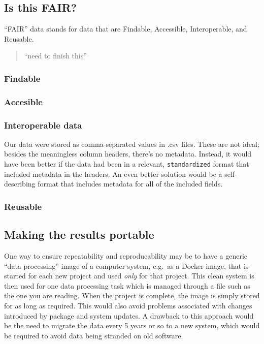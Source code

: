 \documentclass[11pt,]{article}
\begin{document}
\hypertarget{is-this-fair}{%
\subsection{Is this FAIR?}\label{is-this-fair}}

``FAIR'' data stands for data that are Findable, Accessible, Interoperable, and Reusable.

\begin{quote}
``need to finish this''
\end{quote}

\hypertarget{findable}{%
\subsubsection{Findable}\label{findable}}

\hypertarget{accesible}{%
\subsubsection{Accesible}\label{accesible}}

\hypertarget{interoperable-data}{%
\subsubsection{Interoperable data}\label{interoperable-data}}

Our data were stored as comma-separated values in .csv files. These are not ideal; besides the meaningless column headers, there's no metadata. Instead, it would have been better if the data had been in a relevant, \texttt{standardized} format that included metadata in the headers. An even better solution would be a self-describing format that includes metadata for all of the included fields.

\hypertarget{reusable}{%
\subsubsection{Reusable}\label{reusable}}

\hypertarget{making-the-results-portable}{%
\subsection{Making the results portable}\label{making-the-results-portable}}

One way to ensure repeatability and reproducability may be to have a generic ``data processing'' image of a computer system, e.g.~as a Docker image, that is started for each new project and used \emph{only} for that project. This clean system is then used for one data processing task which is managed through a file such as the one you are reading. When the project is complete, the image is simply stored for as long as required. This would also avoid problems associated with changes introduced by package and system updates. A drawback to this approach would be the need to migrate the data every 5 years or so to a new system, which would be required to avoid data being stranded on old software.
\end{document}
